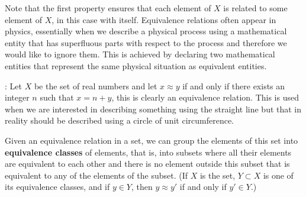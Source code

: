 {{Note that the first property ensures that each element of $X$
is related to some element of $X$, in
this case with itself. Equivalence relations often appear in physics,
essentially when we describe a physical process using a mathematical entity that has superfluous parts with respect to the process and
therefore we would like to ignore them.
This is achieved by declaring two mathematical entities that represent the same physical situation
as equivalent entities.

\ejem: Let $X$ be the set of real numbers and let $x \approx y$
if and only if there exists an integer $n$ such that $x = n + y$, this
is clearly an equivalence relation. This is used when 
we are interested in describing something using the straight line but that in
reality should be described using a circle of unit circumference.


Given an equivalence relation in a set, we can group the
elements of this set into {\bf equivalence classes} of elements, that is,
into subsets where all their elements are equivalent to each other
and there is no element outside this subset that is
equivalent to any of the elements of the subset.
(If $X$ is the set, $Y \subset X$ is one of its equivalence classes,
and if $y \in Y$, then $y \approx y'$ if and only if $y' \in Y$.)

}
}

